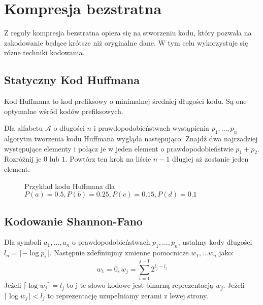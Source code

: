 \documentclass{../notatki}
\begin{document}
\section{Kompresja bezstratna}

Z reguły kompresja bezstratna opiera się na stworzeniu kodu, który
pozwala na zakodowanie będące krótsze niż oryginalne dane. W tym celu
wykorzystuje się różne techniki kodowania.

\subsection{Statyczny Kod Huffmana}

Kod Huffmana to kod prefiksowy o minimalnej średniej długości kodu.
Są one optymalne wśród kodów prefiksowych.

Dla alfabetu $\mathcal{A}$ o długości $n$ i prawdopodobieństwach
wystąpienia $p_1, \dots, p_n$ algorytm tworzenia kodu Huffmana wygląda
następująco:
Znajdź dwa najrzadziej występujące elementy i połącz je w jeden element
o prawdopodobieństwie $p_1 + p_2$. Rozróżnij je $0$ lub $1$. Powtórz
ten krok na liście $n-1$ długiej aż zostanie jeden element.

\begin{figure*}[h]
  \centering
  \caption{Przykład kodu Huffmana dla $P(a) = 0.5, P(b) = 0.25, P(c)
  = 0.15, P(d) = 0.1$}
\end{figure*}

\subsection{Kodowanie Shannon-Fano}

Dla symboli $a_1, \dots, a_n$ o prawdopodobieństwach $p_1, \dots, p_n$,
ustalmy kody długości $l_n = \lceil - \log p_i \rceil$. Następnie
zdefiniujmy zmienne pomocnicze $w_1, \dots w_n$ jako:
$$
w_1 = 0, w_j = \sum_{i=1}^{j-1}2^{l_j - l_i}
$$
Jeżeli $\lceil \log w_j \rceil = l_j$ to j-te słowo kodowe jest binarną
reprezentacją $w_j$. Jeżeli $\lceil \log w_j \rceil < l_j$ to reprezentację
uzupełniamy zerami z lewej strony.
\end{document}
